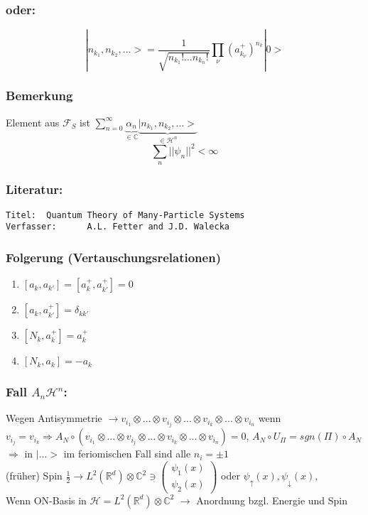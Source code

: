 \documentclass[twoside,a4paper]{scrartcl}
\newcommand{\R}{\mathbb{R}}
\newcommand{\C}{\mathbb{C}}
\renewcommand{\1}{\mathds{1}}
\newcommand{\Ra}{\Rightarrow}
\newcommand{\ra}{\rightarrow}
\renewcommand{\H}{\mathcal{H}}
\newcommand{\F}{\mathcal{F}}
\renewcommand{\R}{\mathbb{R}}
\renewcommand{\C}{\mathbb{C}}
\begin{document}
\subsubsection*{oder:} 
$$|n_{k_1},n_{k_2},...>=\frac{1}{\sqrt{n_{k_1}!...n_{k_n}!}}\prod_\nu (a^+_{k_\nu})^{n_k}|0>$$
\subsubsection*{Bemerkung} 
Element aus $\F_S$ ist $\sum_{n=0}^\infty \underbrace{\alpha_n}_{\in \C}\underbrace{|n_{k_1},n_{k_2},...>}_{\in \H^n} $
$$\sum_n ||\psi_n||^2<\infty$$

\subsubsection*{Literatur:}
\begin{tiny}
\begin{verbatim}
Titel:  Quantum Theory of Many-Particle Systems
Verfasser:      A.L. Fetter and J.D. Walecka
\end{verbatim}
\end{tiny}

\subsubsection*{Folgerung (Vertauschungsrelationen)} 
\begin{enumerate}
\item $[a_k,a_{k'}]=[a_k^+,a_{k'}^+]=0$
\item $[a_k,a_{k'}^+]=\delta_{kk'}$
\item $[N_k,a_k^+]=a_k^+$
\item $[N_k,a_k]=-a_k$
\end{enumerate}
\subsubsection*{Fall $A_n\H^n$:}
Wegen Antisymmetrie $\ra v_{i_1} \otimes ... \otimes v_{i_j} \otimes ... \otimes v_{i_k} \otimes ... \otimes v_{i_n}$ wenn $v_{i_j}=v_{i_k} \Ra A_N \circ(v_{i_1} \otimes ... \otimes v_{i_j} \otimes ... \otimes v_{i_k} \otimes ... \otimes v_{i_n})=0$, $A_N \circ U_\Pi=sgn(\Pi)\circ A_N$ \\
$\Ra$ in $|...>$ im feriomischen Fall sind alle $n_i=\pm 1$\\
(früher) Spin $\frac{1}{2} \ra L^2(\R^d)\otimes \C^2 \ni \begin{pmatrix} \psi_1(x) \\ \psi_2(x) \end{pmatrix}$ oder $\psi_\uparrow(x), \psi_\downarrow(x),$\\
Wenn ON-Basis in $\H=L^2(\R^d)\otimes \C^2$ $\ra$ Anordnung bzgl. Energie und Spin
\end{document}
